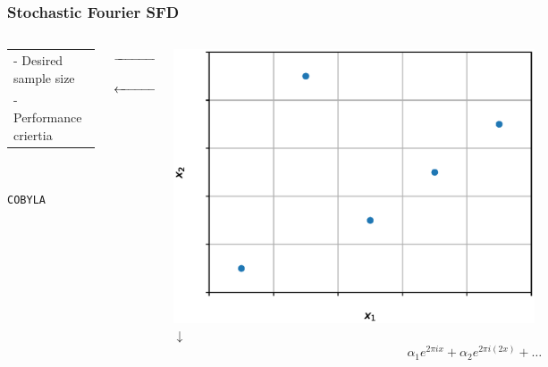 \documentclass[aspectratio=169]{beamer}
\begin{document}
\begin{frame}\frametitle{Stochastic Fourier SFD}
\begin{columns}
\begin{column}{0.3\textwidth}
\begin{center}
\begin{tabular}{l}
 - Desired sample size\\
 - Performance criertia
\end{tabular}\\

\bigskip
\bigskip
\bigskip
\bigskip
\bigskip

{\tt COBYLA}

\end{center}
\end{column}
\begin{column}{0.2\textwidth}

$\xrightarrow{\hspace*{1.5cm}}$\\

\medskip
\bigskip
\bigskip
\bigskip
\bigskip
\bigskip

$\xleftarrow{\hspace*{1.5cm}}$\\

\end{column}
\begin{column}{0.3\textwidth}
\begin{center}
\includegraphics[width=0.6\textwidth]{lh_doe.eps}\\

$\downarrow$\\

$$
\alpha_1 e^{2\pi i x} + \alpha_2 e^{2 \pi i (2x)} + \ldots
$$
\end{center}
\end{column}
\end{columns}
\end{frame}
\end{document}
